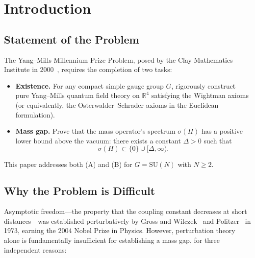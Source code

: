 \documentclass[12pt,a4paper]{article}
\theoremstyle{plain}
\theoremstyle{definition}
\theoremstyle{remark}
\begin{document}
\tableofcontents

\section{Introduction}\label{sec:intro}

\subsection{Statement of the Problem}\label{sec:problem}

The Yang--Mills Millennium Prize Problem, posed by the Clay Mathematics Institute in 2000~\cite{JaffeWitten2000}, requires the completion of two tasks:

\begin{itemize}[leftmargin=2.5em]
\item[\textbf{(A)}] \textbf{Existence.} For any compact simple gauge group $G$, rigorously construct pure Yang--Mills quantum field theory on $\mathbb{R}^4$ satisfying the Wightman axioms (or equivalently, the Osterwalder--Schrader axioms in the Euclidean formulation).

\item[\textbf{(B)}] \textbf{Mass gap.} Prove that the mass operator's spectrum $\sigma(H)$ has a positive lower bound above the vacuum: there exists a constant $\Delta>0$ such that
\[
\sigma(H)\subset\{0\}\cup[\Delta,\infty).
\]
\end{itemize}

This paper addresses both (A) and (B) for $G=\mathrm{SU}(N)$ with $N\geq 2$.

\subsection{Why the Problem is Difficult}\label{sec:difficulty}

Asymptotic freedom---the property that the coupling constant decreases at short distances---was established perturbatively by Gross and Wilczek~\cite{GrossWilczek1973} and Politzer~\cite{Politzer1973} in 1973, earning the 2004 Nobel Prize in Physics. However, perturbation theory alone is fundamentally insufficient for establishing a mass gap, for three independent reasons:
\end{document}
